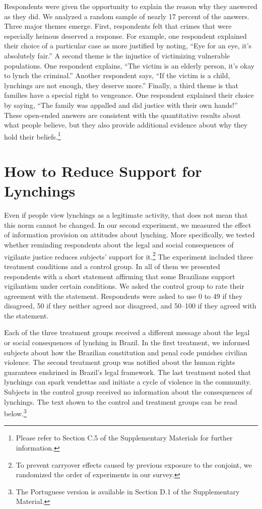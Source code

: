 \documentclass[12pt,a4paper]{article}
\begin{document}
Respondents were given the opportunity to explain the reason why they answered
as they did. We analyzed a random sample of nearly 17 percent of the answers.
Three major themes emerge. First, respondents felt that crimes that were
especially heinous deserved a response. For example, one respondent explained
their choice of a particular case as more justified by noting, ``Eye for an
eye, it's absolutely fair.'' A second  theme is the injustice of victimizing
vulnerable populations. One respondent explains, ``The victim is an elderly
person, it's okay to lynch the criminal.'' Another respondent says, ``If the
victim is a child, lynchings are not enough, they deserve more.'' Finally, a
third theme is that families have a special right to vengeance. One respondent
explained their choice by saying, ``The family was appalled and did justice
with their own hands!'' These open-ended answers are consistent with the
quantitative results about what people believe, but they also provide
additional evidence about why they hold their beliefs.\footnote{Please refer to
Section C.5 of the Supplementary Materials for further information.} 

\section*{How to Reduce Support for Lynchings}
\label{sec:exp03}

Even if people view lynchings as a legitimate activity, that does not mean that
this norm cannot be changed. In our second experiment, we measured the effect
of information provision on attitudes about lynching. More specifically, we
tested whether reminding respondents about the legal and social consequences of
vigilante justice reduces subjects' support for it.\footnote{To prevent
carryover effects caused by previous exposure to the conjoint, we randomized
the order of experiments in our survey.} The experiment included three
treatment conditions and a control group. In all of them we presented
respondents with a short statement affirming that some Brazilians support
vigilantism under certain conditions. We asked the control group to rate their
agreement with the statement. Respondents were asked to use 0 to 49 if they
disagreed, 50 if they neither agreed nor disagreed, and 50--100 if they agreed
with the statement.

Each of the three treatment groups received a different message about the legal
or social consequences of lynching in Brazil. In the first treatment, we
informed subjects about how the Brazilian constitution and penal code punishes
civilian violence. The second treatment group was notified about the human
rights guarantees enshrined in Brazil's legal framework. The last treatment
noted that lynchings can spark vendettas and initiate a cycle of violence in
the community. Subjects in the control group received no information about the
consequences of lynchings. The text shown to the control and treatment groups
can be read below.\footnote{The Portuguese version is available in Section D.1
of the Supplementary Material.} 
\end{document}
